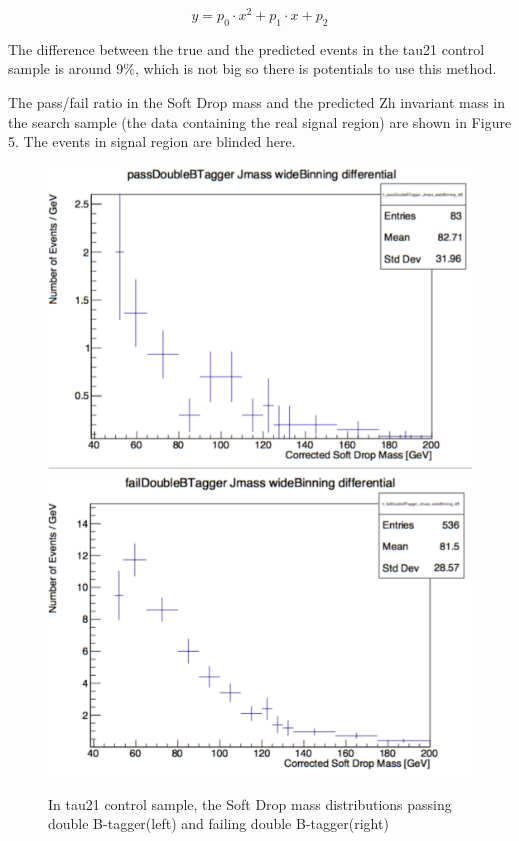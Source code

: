\documentclass{article}
\begin{document}
\begin{equation}
y=p_{0}\cdot x^{2}+p_{1}\cdot x+p_{2}
\end{equation}

The difference between the true and the predicted events in the tau21 control sample is around 9\%, which is not big so there is potentials to use this method.

The pass/fail ratio in the Soft Drop mass and the predicted Zh invariant mass in the search sample (the data containing the real signal region) are shown in Figure 5. The events in signal region are blinded here.


\begin{figure}
\centering
\includegraphics[width=.45\textwidth]{figures/tau21Region_Pass.pdf}\quad
\includegraphics[width=.45\textwidth]{figures/tau21Region_Fail.pdf}
\caption{In tau21 control sample, the Soft Drop mass distributions passing double B-tagger(left) and failing double B-tagger(right)}
\label{pics:blablabla}
\end{figure}
\end{document}
